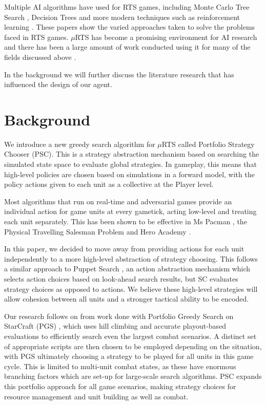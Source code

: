 \documentclass[]{article}
\begin{document}
Multiple AI algorithms have used for RTS games, including Monte Carlo Tree Search \cite{chaslot2008monte}, Decision Trees \cite{weber2011building} and more modern techniques such as reinforcement learning \cite{wender2012applying}. These papers show the varied approaches taken to solve the problems faced in RTS games. $\mu$RTS has become a promising environment for AI research and there has been a large amount of work conducted using it for many of the fields discussed above \cite{barriga2017combining}\cite{barriga2018game}\cite{ontanon2015adversarial}\cite{ontanon2018first}.

In the background we will further discuss the literature research that has influenced the design of our agent. 

\section{Background}

We introduce a new greedy search algorithm for $\mu$RTS called Portfolio Strategy Chooser (PSC). This is a strategy abstraction mechanism based on searching the simulated state space to evaluate global strategies. In gameplay, this means that high-level policies are chosen based on simulations in a forward model, with the policy actions given to each unit as a collective at the Player level.

Most algorithms that run on real-time and adversarial games provide an individual action for game units at every gametick, acting low-level and treating each unit separately. This has been shown to be effective in Ms Pacman \cite{pepels2014real}, the Physical Travelling Salesman Problem \cite{perez2013rolling} and Hero Academy \cite{barriga2018game}.

In this paper, we decided to move away from providing actions for each unit independently to a more high-level abstraction of strategy choosing. This follows a similar approach to Puppet Search \cite{barriga2018game}, an action abstraction mechanism which selects action choices based on look-ahead search results, but SC evaluates strategy choices as opposed to actions. We believe these high-level strategies will allow cohesion between all units and a stronger tactical ability to be encoded.

Our research follows on from work done with Portfolio Greedy Search on StarCraft (PGS) \cite{churchill2013portfolio}, which uses hill climbing and accurate playout-based evaluations to efficiently search even the largest combat scenarios. A distinct set of appropriate scripts are then chosen to be employed depending on the situation, with PGS ultimately choosing a strategy to be played for all units in this game cycle. This is limited to multi-unit combat states, as these have enormous branching factors which are set-up for large-scale search algorithms. PSC expands this portfolio approach for all game scenarios, making strategy choices for resource management and unit building as well as combat.
\end{document}
